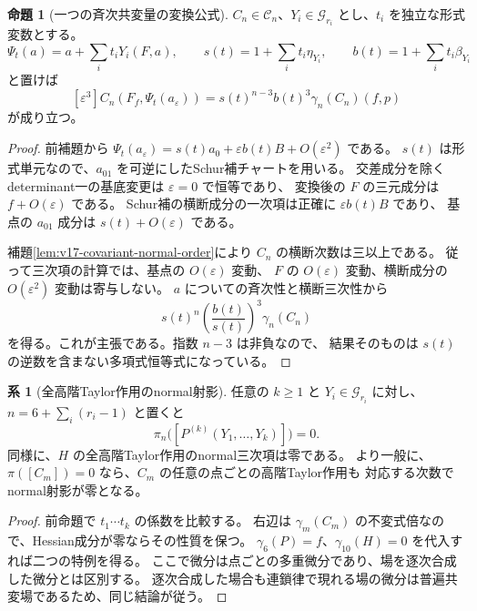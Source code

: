 \documentclass[a4paper,11pt]{ltjsarticle}
\theoremstyle{definition}
\newtheorem{proposition}[theorem]{命題}
\newtheorem{corollary}[theorem]{系}
\begin{document}
\begin{proposition}[一つの斉次共変量の変換公式]
\label{prop:v18-homogeneous-normal-pullback}
$C_n\in\mathcal C_n$、$Y_i\in\mathcal G_{r_i}$ とし、$t_i$ を独立な形式変数とする。
\[
 \Psi_t(a)=a+\sum_i t_iY_i(F,a),\qquad
 s(t)=1+\sum_i t_i\eta_{Y_i},\qquad
 b(t)=1+\sum_i t_i\beta_{Y_i}
\]
と置けば
\begin{equation}\label{eq:v18-homogeneous-normal-pullback}
 [\varepsilon^3]C_n(F_f,\Psi_t(a_\varepsilon))
    =s(t)^{n-3}b(t)^3\gamma_n(C_n)(f,p)
\end{equation}
が成り立つ。
\end{proposition}

\begin{proof}
前補題から $\Psi_t(a_\varepsilon)=s(t)a_0+
\varepsilon b(t)B+O(\varepsilon^2)$ である。
$s(t)$ は形式単元なので、$a_{01}$ を可逆にしたSchur補チャートを用いる。
交差成分を除くdeterminant一の基底変更は $\varepsilon=0$ で恒等であり、
変換後の $F$ の三元成分は $f+O(\varepsilon)$ である。
Schur補の横断成分の一次項は正確に $\varepsilon b(t)B$ であり、
基点の $a_{01}$ 成分は $s(t)+O(\varepsilon)$ である。

補題\ref{lem:v17-covariant-normal-order}により $C_n$ の横断次数は三以上である。
従って三次項の計算では、基点の $O(\varepsilon)$ 変動、
$F$ の $O(\varepsilon)$ 変動、横断成分の $O(\varepsilon^2)$ 変動は寄与しない。
$a$ についての斉次性と横断三次性から
\[
 s(t)^n\left(\frac{b(t)}{s(t)}\right)^3\gamma_n(C_n)
\]
を得る。これが主張である。指数 $n-3$ は非負なので、
結果そのものは $s(t)$ の逆数を含まない多項式恒等式になっている。
\end{proof}

\begin{corollary}[全高階Taylor作用のnormal射影]
\label{cor:v18-all-higher-actions-normal-zero}
任意の $k\ge1$ と $Y_i\in\mathcal G_{r_i}$ に対し、
$n=6+\sum_i(r_i-1)$ と置くと
\[
 \pi_n\bigl([P^{(k)}(Y_1,\ldots,Y_k)]\bigr)=0.
\]
同様に、$H$ の全高階Taylor作用のnormal三次項は零である。
より一般に、$\pi([C_m])=0$ なら、$C_m$ の任意の点ごとの高階Taylor作用も
対応する次数でnormal射影が零となる。
\end{corollary}

\begin{proof}
前命題で $t_1\cdots t_k$ の係数を比較する。
右辺は $\gamma_m(C_m)$ の不変式倍なので、Hessian成分が零ならその性質を保つ。
$\gamma_6(P)=f$、$\gamma_{10}(H)=0$ を代入すれば二つの特例を得る。
ここで微分は点ごとの多重微分であり、場を逐次合成した微分とは区別する。
逐次合成した場合も連鎖律で現れる場の微分は普遍共変場であるため、同じ結論が従う。
\end{proof}
\end{document}
